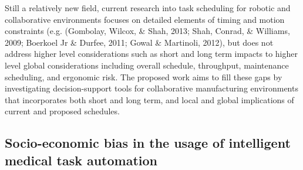 Still a relatively new field, current research into task scheduling for robotic and collaborative environments focuses on detailed elements of timing and motion constraints (e.g. (Gombolay, Wilcox, \& Shah, 2013; Shah, Conrad, \& Williams, 2009; Boerkoel Jr \& Durfee, 2011; Gowal \& Martinoli, 2012), but does not address higher level considerations such as short and long term impacts to higher level global considerations including overall schedule, throughput, maintenance scheduling, and ergonomic risk. The proposed work aims to fill these gaps by investigating decision-support tools for collaborative manufacturing environments that incorporates both short and long term, and local and global implications of current and proposed schedules.

\subsection{Socio-economic bias in the usage of intelligent medical task automation}

